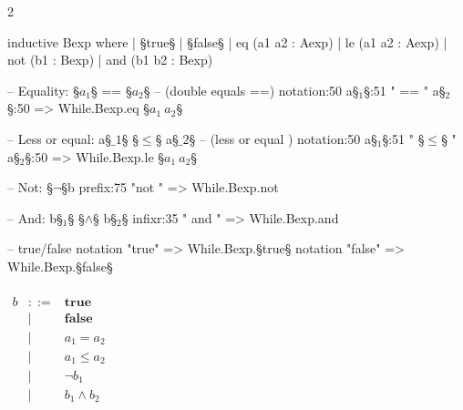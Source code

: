 \begin{paracol}{2}
\begin{leftcolumn}
  \begin{Lean_Code}
inductive Bexp where
  | §true§
  | §false§
  | eq  (a1 a2 : Aexp)
  | le  (a1 a2 : Aexp)
  | not (b1 : Bexp)
  | and (b1 b2 : Bexp)

-- Equality: §\color{green!40!black}\(a_1\)§ == §\color{green!40!black}\(a_2\)§
-- (double equals ==)
notation:50
    a§\(_1\)§:51 " == " a§\(_2\)§:50 =>
    While.Bexp.eq §\(a_1\ a_2\)§

-- Less or equal: a§\color{green!40!black}\(\_1\)§ §\color{green!40!black}\(\leq\)§ a§\color{green!40!black}\(\_2\)§ 
-- (less or equal \leq)
notation:50
    a§\(_1\)§:51 " §\color{purple}\(\leq\)§ " a§\(_2\)§:50 =>
    While.Bexp.le §\(a_1\ a_2\)§

-- Not: §\color{green!40!black}\(\neg\)§b
prefix:75 "not " =>
    While.Bexp.not

-- And: b§\(_1\)§ §\color{green!40!black}\(\land\)§ b§\(_2\)§
infixr:35 " and " =>
    While.Bexp.and 

-- true/false
notation "true" =>
    While.Bexp.§true§
notation "false" =>
    While.Bexp.§false§
    \end{Lean_Code}
\end{leftcolumn}
\begin{rightcolumn}
    \(\displaystyle
\begin{array}{lcl}
    \\[0.3em]
    b &::=& \mathbf{true} \\ 
        &\mid& \mathbf{false} \\ 
        &\mid& a_1 = a_2 \\ 
        &\mid& a_1 \leq a_2 \\ 
        &\mid& \neg b_1 \\ 
        &\mid& b_1 \land b_2
\end{array}
    \)
\end{rightcolumn}
\end{paracol}
\vspace{1em}

